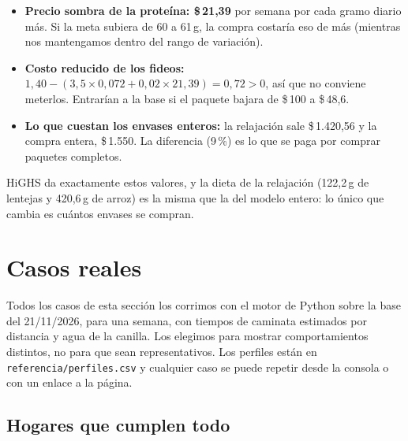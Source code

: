 \documentclass[10pt,a4paper]{article}
\newcommand{\pesos}[1]{\$\,#1}
\begin{document}
\begin{itemize}
  \item \textbf{Precio sombra de la proteína: \pesos{21,39}} por semana por cada gramo
        diario más. Si la meta subiera de 60 a 61\,g, la compra costaría eso de más
        (mientras nos mantengamos dentro del rango de variación).
  \item \textbf{Costo reducido de los fideos:}
        $1{,}40 - (3{,}5 \times 0{,}072 + 0{,}02 \times 21{,}39) = 0{,}72 > 0$, así
        que no conviene meterlos. Entrarían a la base si el paquete bajara de
        \pesos{100} a \pesos{48,6}.
  \item \textbf{Lo que cuestan los envases enteros:} la relajación sale
        \pesos{1.420,56} y la compra entera, \pesos{1.550}. La diferencia (9\,\%) es
        lo que se paga por comprar paquetes completos.
\end{itemize}

HiGHS da exactamente estos valores, y la dieta de la relajación (122,2\,g de
lentejas y 420,6\,g de arroz) es la misma que la del modelo entero: lo único que
cambia es cuántos envases se compran.

\section{Casos reales}
\label{sec:casos}

Todos los casos de esta sección los corrimos con el motor de Python sobre la base del
21/11/2026, para una semana, con tiempos de caminata estimados por distancia y agua
de la canilla. Los elegimos para mostrar comportamientos distintos, no para que sean
representativos. Los perfiles están en \texttt{referencia/perfiles.csv} y cualquier
caso se puede repetir desde la consola o con un enlace a la página.

\subsection{Hogares que cumplen todo}
\end{document}
